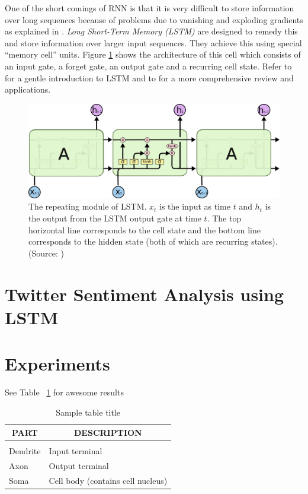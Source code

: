 \documentclass{article} %
\begin{document}
One of the short comings of RNN is that it is very difficult to store information over long sequences because of problems due to vanishing and exploding gradients as explained in \cite{hochreiter2001gradient}.
{\it Long Short-Term Memory (LSTM)} \cite{hochreiter1997long} are designed to remedy this and store information over larger input sequences.
They achieve this using special ``memory cell'' units. 
Figure \ref{fig:lstm} shows the architecture of this cell which consists of an input gate, a forget gate, an output gate and a recurring cell state. 
Refer to \cite{colah} for a gentle introduction to LSTM and to \cite{graves2012supervised} for a more comprehensive review and applications.

\begin{figure}
	\centering
	\includegraphics[width=\textwidth]{figs/LSTM.png}
	\caption{The repeating module of LSTM. $x_t$ is the input as time $t$ and $h_t$ is the output from the LSTM output gate at time $t$. The top horizontal line corresponds to the cell state and the bottom line corresponds to the hidden state (both of which are recurring states).
	(Source: \cite{colah})}
	\label{fig:lstm}
\end{figure}


\section{Twitter Sentiment Analysis using LSTM}


\section{Experiments}
See Table ~\ref{sample-table} for awesome results

\begin{table}[h]
\caption{Sample table title}
\label{sample-table}
\begin{center}
\begin{tabular}{ll}
\multicolumn{1}{c}{\bf PART}  &\multicolumn{1}{c}{\bf DESCRIPTION}
\\ \hline \\
Dendrite         &Input terminal \\
Axon             &Output terminal \\
Soma             &Cell body (contains cell nucleus) \\
\end{tabular}
\end{center}
\end{table}
\end{document}

